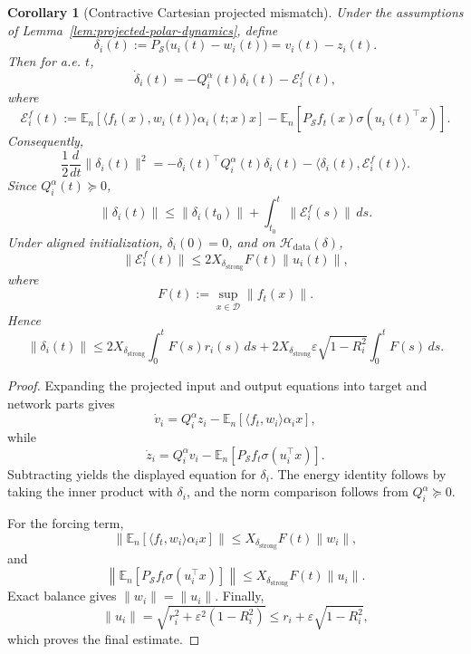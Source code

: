 \documentclass{article} %
\theoremstyle{plain}
\newtheorem{corollary}[theorem]{Corollary}
\theoremstyle{definition}
\theoremstyle{remark}
\begin{document}
\begin{corollary}[Contractive Cartesian projected mismatch]
\label{cor:projected-mismatch}
Under the assumptions of Lemma~\ref{lem:projected-polar-dynamics}, define
\[
\boxed{
\delta_i(t)
:=
P_{\mathcal S}\bigl(u_i(t)-w_i(t)\bigr)
=
v_i(t)-z_i(t).
}
\]
Then for a.e. $t$,
\[
\boxed{
\dot\delta_i(t)
=
-Q_i^\alpha(t)\delta_i(t)
-
\mathcal E_i^f(t),
}
\]
where
\[
\boxed{
\mathcal E_i^f(t)
:=
\mathbb E_n
\left[
\langle f_t(x),w_i(t)\rangle
\alpha_i(t;x)x
\right]
-
\mathbb E_n
\left[
P_{\mathcal S}f_t(x)
\sigma(u_i(t)^\top x)
\right].
}
\]
Consequently,
\[
\boxed{
\frac12\frac{d}{dt}\|\delta_i(t)\|^2
=
-\delta_i(t)^\top Q_i^\alpha(t)\delta_i(t)
-
\langle\delta_i(t),\mathcal E_i^f(t)\rangle.
}
\]
Since $Q_i^\alpha(t)\succeq0$,
\[
\boxed{
\|\delta_i(t)\|
\le
\|\delta_i(t_0)\|
+
\int_{t_0}^t\|\mathcal E_i^f(s)\|\,ds.
}
\]
Under aligned initialization, $\delta_i(0)=0$, and on
$\mathcal H_{\mathrm{data}}(\delta)$,
\[
\boxed{
\|\mathcal E_i^f(t)\|
\le
2X_{\delta_{\mathrm{strong}}}
F(t)\|u_i(t)\|,
}
\]
where
\[
F(t):=
\sup_{x\in\mathcal D}\|f_t(x)\|.
\]
Hence
\[
\boxed{
\|\delta_i(t)\|
\le
2X_{\delta_{\mathrm{strong}}}
\int_0^t
F(s)r_i(s)\,ds
+
2X_{\delta_{\mathrm{strong}}}
\varepsilon\sqrt{1-R_i^2}
\int_0^tF(s)\,ds.
}
\]
\end{corollary}

\begin{proof}
Expanding the projected input and output equations into target and network
parts gives
\[
\dot v_i
=
Q_i^\alpha z_i
-
\mathbb E_n
\left[
\langle f_t,w_i\rangle\alpha_i x
\right],
\]
while
\[
\dot z_i
=
Q_i^\alpha v_i
-
\mathbb E_n
\left[
P_{\mathcal S}f_t\sigma(u_i^\top x)
\right].
\]
Subtracting yields the displayed equation for $\delta_i$.  The energy
identity follows by taking the inner product with $\delta_i$, and the norm
comparison follows from $Q_i^\alpha\succeq0$.

For the forcing term,
\[
\left\|
\mathbb E_n
\left[
\langle f_t,w_i\rangle\alpha_i x
\right]
\right\|
\le
X_{\delta_{\mathrm{strong}}}F(t)\|w_i\|,
\]
and
\[
\left\|
\mathbb E_n
\left[
P_{\mathcal S}f_t\sigma(u_i^\top x)
\right]
\right\|
\le
X_{\delta_{\mathrm{strong}}}F(t)\|u_i\|.
\]
Exact balance gives $\|w_i\|=\|u_i\|$.  Finally,
\[
\|u_i\|
=
\sqrt{r_i^2+\varepsilon^2(1-R_i^2)}
\le
r_i+\varepsilon\sqrt{1-R_i^2},
\]
which proves the final estimate.
\end{proof}
\end{document}
